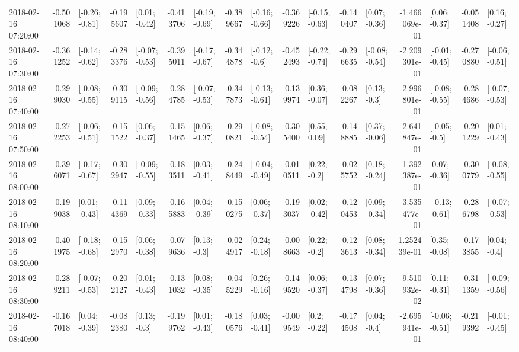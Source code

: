 \begin{tabular}{lrlrlrlrlrlrlrlrl}
2018-02-16 07:20:00 & -0.501068 &  [-0.26; -0.81] & -0.195607 &   [0.01; -0.42] & -0.413706 &  [-0.19; -0.69] & -0.389667 &  [-0.16; -0.66] & -0.369226 &  [-0.15; -0.63] & -0.140407 &   [0.07; -0.36] & -1.466069e-01 &   [0.06; -0.37] & -0.051408 &   [0.16; -0.27] \\
2018-02-16 07:30:00 & -0.361252 &  [-0.14; -0.62] & -0.283376 &  [-0.07; -0.53] & -0.395011 &  [-0.17; -0.67] & -0.344878 &   [-0.12; -0.6] & -0.452493 &  [-0.22; -0.74] & -0.296635 &  [-0.08; -0.54] & -2.209301e-01 &  [-0.01; -0.45] & -0.270880 &  [-0.06; -0.51] \\
2018-02-16 07:40:00 & -0.299030 &  [-0.08; -0.55] & -0.309115 &  [-0.09; -0.56] & -0.284785 &  [-0.07; -0.53] & -0.347873 &  [-0.13; -0.61] &  0.139974 &   [0.36; -0.07] & -0.082267 &    [0.13; -0.3] & -2.996801e-01 &  [-0.08; -0.55] & -0.284686 &  [-0.07; -0.53] \\
2018-02-16 07:50:00 & -0.272253 &  [-0.06; -0.51] & -0.151522 &   [0.06; -0.37] & -0.151465 &   [0.06; -0.37] & -0.290821 &  [-0.08; -0.54] &  0.305400 &    [0.55; 0.09] &  0.148885 &   [0.37; -0.06] & -2.641847e-01 &   [-0.05; -0.5] & -0.201229 &   [0.01; -0.43] \\
2018-02-16 08:00:00 & -0.396071 &  [-0.17; -0.67] & -0.302947 &  [-0.09; -0.55] & -0.183511 &   [0.03; -0.41] & -0.248449 &  [-0.04; -0.49] &  0.010511 &    [0.22; -0.2] & -0.025752 &   [0.18; -0.24] & -1.392387e-01 &   [0.07; -0.36] & -0.300779 &  [-0.08; -0.55] \\
2018-02-16 08:10:00 & -0.199038 &   [0.01; -0.43] & -0.114369 &   [0.09; -0.33] & -0.165883 &   [0.04; -0.39] & -0.150275 &   [0.06; -0.37] & -0.193037 &   [0.02; -0.42] & -0.120453 &   [0.09; -0.34] & -3.535477e-01 &  [-0.13; -0.61] & -0.286798 &  [-0.07; -0.53] \\
2018-02-16 08:20:00 & -0.401975 &  [-0.18; -0.68] & -0.152970 &   [0.06; -0.38] & -0.079636 &    [0.13; -0.3] &  0.024917 &   [0.24; -0.18] &  0.008663 &    [0.22; -0.2] & -0.123613 &   [0.08; -0.34] &  1.252439e-01 &   [0.35; -0.08] & -0.173855 &    [0.04; -0.4] \\
2018-02-16 08:30:00 & -0.289211 &  [-0.07; -0.53] & -0.202127 &   [0.01; -0.43] & -0.131032 &   [0.08; -0.35] &  0.045229 &   [0.26; -0.16] & -0.149520 &   [0.06; -0.37] & -0.134798 &   [0.07; -0.36] & -9.510932e-02 &   [0.11; -0.31] & -0.311359 &  [-0.09; -0.56] \\
2018-02-16 08:40:00 & -0.167018 &   [0.04; -0.39] & -0.082380 &    [0.13; -0.3] & -0.199762 &   [0.01; -0.43] & -0.180576 &   [0.03; -0.41] & -0.009549 &    [0.2; -0.22] & -0.174508 &    [0.04; -0.4] & -2.695941e-01 &  [-0.06; -0.51] & -0.219392 &  [-0.01; -0.45] \\

\end{tabular}
